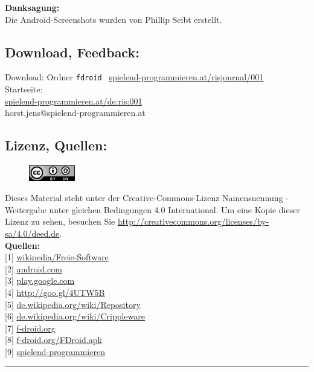 \documentclass[10pt,a4paper,ngerman,twoside]{article} %
\newcommand{\SepRule}{\noindent	%
\begin{center}
\rule{250pt}{1pt} %
\end{center}
}
\begin{document}
\begin{multicols}{3}
\textbf{Danksagung:} \\
Die Android-Screenshots wurden von Phillip Seibt erstellt.

\subsection*{Download, Feedback:}
\footnotesize{
Download: Ordner \texttt{fdroid} \Mundus\ \href{http://spielend-programmieren.at/risjournal/001}{spielend-programmieren.at/risjournal/001}\\
Startseite:\\
\href{http://spielend-programmieren.at/de:ris:001}{spielend-programmieren.at/de:ris:001}\\ 
\Letter\:  horst.jens@spielend-programmieren.at \\}
\normalsize{}

\subsection*{Lizenz, Quellen:}
\begin{figure}
\includegraphics[width=2cm]{fdroid/ccbysa88x31.png}
\end{figure}
Dieses Material steht unter der Creative-Commons-Lizenz Namensnennung - Weitergabe unter gleichen Bedingungen 4.0 International. Um eine Kopie dieser Lizenz zu sehen, besuchen Sie \url{http://creativecommons.org/licenses/by-sa/4.0/deed.de}. \\

\textbf{Quellen:} \\
{[}1{]} \href{http://de.wikipedia.org/wiki/Freie_Software}{wikipedia/Freie-Software} \\
{[}2{]} \href{http://www.android.com}{android.com} \\
{[}3{]} \href{https://play.google.com/store}{play.google.com} \\
{[}4{]} \href{http://de.wikipedia.org/wiki/GNU_General_Public_License}{http://goo.gl/4UTW5B} \\
{[}5{]} \href{http://de.wikipedia.org/wiki/Repository}{de.wikipedia.org/wiki/Repository} \\
{[}6{]} \href{http://de.wikipedia.org/wiki/Crippleware}{de.wikipedia.org/wiki/Crippleware} \\
{[}7{]} \href{http://f-droid.org/}{f-droid.org} \\
{[}8{]} \href{http://f-droid.org/FDroid.apk}{f-droid.org/FDroid.apk} \\
{[}9{]} \href{http://spielend-programmieren.at}{spielend-programmieren} 
\end{multicols}
\SepRule
\end{document}
